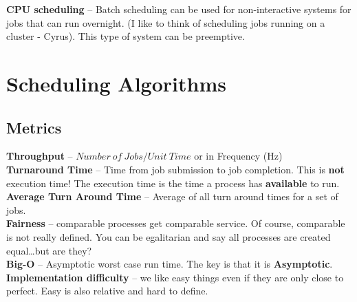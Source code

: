 \documentclass[../base_file/cs1550_notes.tex]{subfiles}
\begin{document}
\textbf{CPU scheduling} -- Batch scheduling can be used for non-interactive
systems for jobs that can run overnight.
(I like to think of scheduling jobs running on a cluster - Cyrus).
This type of system can be preemptive.\\

\section{Scheduling Algorithms}
\subsection{Metrics}
\textbf{Throughput} -- $Number\ of\ Jobs / Unit\ Time$ or in Frequency (Hz)\\
\textbf{Turnaround Time} -- Time from job submission to job completion.
This is \textbf{not} execution time!
The execution time is the time a process has \textbf{available} to run.\\
\textbf{Average Turn Around Time} -- Average of all turn around times for a 
set of jobs.\\
\textbf{Fairness} -- comparable processes get comparable service\@.
Of course, comparable is not really defined\@.
You can be egalitarian and say all processes are created equal\dots but are they?\\
\textbf{Big-O} -- Asymptotic worst case run time\@.
The key is that it is \textbf{Asymptotic}.\\
\textbf{Implementation difficulty} -- we like easy things even if they are only
close to perfect\@.
Easy is also relative and hard to define.\\
\end{document}
